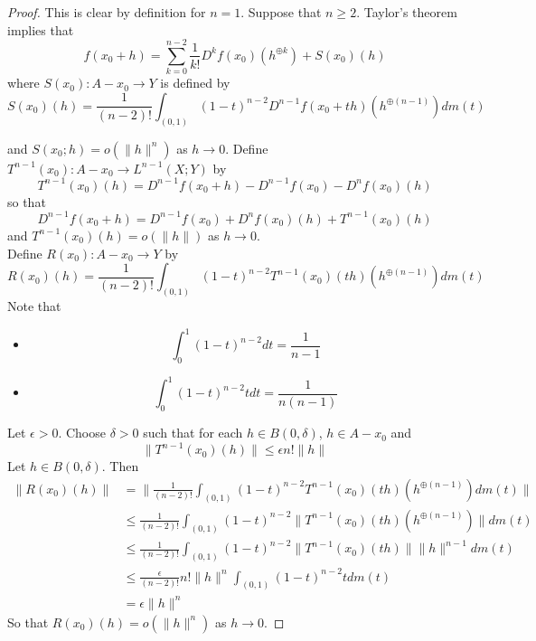 \documentclass[12pt]{amsart}
\theoremstyle{definition}
\newcommand{\del}{\delta}
\newcommand{\ep}{\epsilon}
\DeclareMathOperator*{\0}{\mbf{0}}
\DeclareMathOperator*{\1}{\mbf{1}}
\begin{document}
	\begin{proof}
	This is clear by definition for $n = 1$. Suppose that $n \geq 2$. Taylor's theorem implies that $$f(x_0 + h) = \sum_{k=0}^{n-2} \frac{1}{k!} D^k f(x_0)(h^{\oplus k}) + S(x_0)(h)$$ 
	where $S(x_0): A - x_0 \rightarrow Y$ is defined by 
	$$S(x_0)(h) = \frac{1}{(n-2)!}\int_{(0,1)} (1-t)^{n-2}D^{n-1}f(x_0 + th)(h^{\oplus (n-1)})d m(t)$$
	
	and $S(x_0; h) = o(\|h\|^{n})$ as $h \rightarrow 0$.
	Define $T^{n-1}(x_0):A-x_0 \rightarrow L^{n-1}(X;Y)$ by 
	$$T^{n-1}(x_0)(h) = D^{n-1}f(x_0 + h) - D^{n-1}f(x_0) - D^nf(x_0)(h)$$ 
	so that 
	$$D^{n-1}f(x_0 + h) = D^{n-1}f(x_0) + D^nf(x_0)(h) + T^{n-1}(x_0)(h)$$ 
	and $T^{n-1}(x_0)(h) = o(\|h\|)$ as $h \rightarrow 0$. \\
	Define $R(x_0): A - x_0 \rightarrow Y$ by 
	$$R(x_0)(h) = \frac{1}{(n-2)!} \int_{(0,1)} (1-t)^{n-2}T^{n-1}(x_0)(th)(h^{\oplus (n-1)}) dm(t) $$
	Note that 
	\begin{itemize}
	\item $$\int_0^1 (1-t)^{n-2} dt = \frac{1}{n-1}$$
	\item $$\int_0^1 (1-t)^{n-2}t dt = \frac{1}{n(n-1)}$$
	\end{itemize}
	Let $\ep >0$. Choose $\del >0$ such that for each $h \in B(0, \del)$, $h \in A - x_0$ and $$\|T^{n-1}(x_0)(h)\| \leq \ep n! \|h\|$$ Let $h \in B(0, \del)$. Then 
	\begin{align*}
	\|R(x_0)(h)\|
	&= \bigg \|  \frac{1}{(n-2)!} \int_{(0,1)} (1-t)^{n-2}T^{n-1}(x_0)(th)(h^{\oplus (n-1)}) dm(t) \bigg \| \\
	& \leq  \frac{1}{(n-2)!} \int_{(0,1)} (1-t)^{n-2}\|T^{n-1}(x_0)(th)(h^{\oplus (n-1)})\| dm(t) \\
	& \leq  \frac{1}{(n-2)!} \int_{(0,1)} (1-t)^{n-2} \|T^{n-1}(x_0)(th) \| \|h\|^{n-1} dm(t) \\
	& \leq  \frac{\ep}{(n-2)!}  n!  \|h\|^n \int_{(0,1)} (1-t)^{n-2} t  dm(t) \\		
	&= \ep \|h\|^n  
	\end{align*}
	So that $R(x_0)(h) = o(\|h\|^n)$ as $h \rightarrow 0$. 
	

\end{proof}
\end{document}
